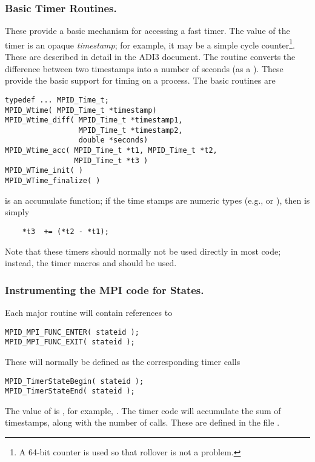 \documentclass{article}
\begin{document}
\subsubsection{Basic Timer Routines.}
These provide a basic mechanism for accessing a fast timer.  The value of the
timer is an opaque \emph{timestamp}; for example, it may be a simple cycle
counter\footnote{A 64-bit counter is used so that rollover is not a
problem.}.  These 
are described in detail in the ADI3 document. 
The routine  converts the difference
between two timestamps into a number of seconds (as a ).  These
provide the basic support for timing on a process.  The basic routines are

\begin{verbatim}
typedef ... MPID_Time_t;
MPID_Wtime( MPID_Time_t *timestamp)
MPID_Wtime_diff( MPID_Time_t *timestamp1, 
                 MPID_Time_t *timestamp2, 
                 double *seconds)
MPID_Wtime_acc( MPID_Time_t *t1, MPID_Time_t *t2, 
                MPID_Time_t *t3 )
MPID_WTime_init( )
MPID_WTime_finalize( )
\end{verbatim}
 is an accumulate function; if the time stamps are numeric
types (e.g.,  or ), then  is
simply
\begin{verbatim}
    *t3  += (*t2 - *t1);
\end{verbatim}

Note that these timers should normally not be used directly in most
code; instead, 
the timer macros  and
 should be used.  

\subsubsection{Instrumenting the MPI code for States.}
Each major routine will contain references to 
\begin{verbatim}
MPID_MPI_FUNC_ENTER( stateid );
MPID_MPI_FUNC_EXIT( stateid );
\end{verbatim}
These will normally be defined as the corresponding timer calls
\begin{verbatim}
MPID_TimerStateBegin( stateid );
MPID_TimerStateEnd( stateid );
\end{verbatim}
The value of  is , for example,
.  The timer code will accumulate the sum of
timestamps, along with the number of calls.  These are defined in the file
. 
\end{document}
